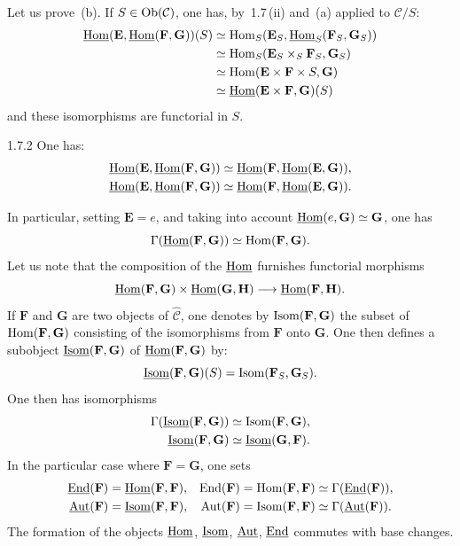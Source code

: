 Let us prove~(b). If \(S\in\operatorname{Ob}(\mathcal{C})\), one has, by~1.7\,(ii) and~(a) applied to \(\mathcal{C}/S\):
\[
\begin{aligned}
\underline{\operatorname{Hom}}(\mathbf{E},\underline{\operatorname{Hom}}(\mathbf{F},\mathbf{G}))(S)
&\simeq\operatorname{Hom}_S(\mathbf{E}_S,\underline{\operatorname{Hom}}_S(\mathbf{F}_S,\mathbf{G}_S))\\
&\simeq\operatorname{Hom}_S(\mathbf{E}_S\times_S\mathbf{F}_S,\mathbf{G}_S)\\
&\simeq\operatorname{Hom}(\mathbf{E}\times\mathbf{F}\times S,\mathbf{G})\\
&\simeq\underline{\operatorname{Hom}}(\mathbf{E}\times\mathbf{F},\mathbf{G})(S)
\end{aligned}
\]
and these isomorphisms are functorial in \(S\).

\begin{corollary}{1.7.2}
\label{I.1.7.2}
One has:
\begin{align*}
\underline{\operatorname{Hom}}(\mathbf{E},\underline{\operatorname{Hom}}(\mathbf{F},\mathbf{G}))
&\simeq\underline{\operatorname{Hom}}(\mathbf{F},\underline{\operatorname{Hom}}(\mathbf{E},\mathbf{G})),\\
\underline{\operatorname{Hom}}(\mathbf{E},\underline{\operatorname{Hom}}(\mathbf{F},\mathbf{G}))
&\simeq\underline{\operatorname{Hom}}(\mathbf{F},\underline{\operatorname{Hom}}(\mathbf{E},\mathbf{G})).
\end{align*}
\end{corollary}

In particular, setting \(\mathbf{E}=e\), and taking into account \(\underline{\operatorname{Hom}}(e,\mathbf{G})\simeq\mathbf{G}\), one has
\[
\Gamma(\underline{\operatorname{Hom}}(\mathbf{F},\mathbf{G}))\simeq\operatorname{Hom}(\mathbf{F},\mathbf{G}).
\]
Let us note that the composition of the \(\underline{\operatorname{Hom}}\) furnishes functorial morphisms
\[
\underline{\operatorname{Hom}}(\mathbf{F},\mathbf{G})\times\underline{\operatorname{Hom}}(\mathbf{G},\mathbf{H})\longrightarrow\underline{\operatorname{Hom}}(\mathbf{F},\mathbf{H}).
\]
If \(\mathbf{F}\) and \(\mathbf{G}\) are two objects of \(\widehat{\mathcal{C}}\), one denotes by \(\operatorname{Isom}(\mathbf{F},\mathbf{G})\) the subset of \(\operatorname{Hom}(\mathbf{F},\mathbf{G})\) consisting of the isomorphisms from \(\mathbf{F}\) onto \(\mathbf{G}\). One then defines a subobject \(\underline{\operatorname{Isom}}(\mathbf{F},\mathbf{G})\) of \(\underline{\operatorname{Hom}}(\mathbf{F},\mathbf{G})\) by:
\[
\underline{\operatorname{Isom}}(\mathbf{F},\mathbf{G})(S)=\operatorname{Isom}(\mathbf{F}_S,\mathbf{G}_S).
\]
One then has isomorphisms
\[
\begin{aligned}
\Gamma(\underline{\operatorname{Isom}}(\mathbf{F},\mathbf{G}))&\simeq\operatorname{Isom}(\mathbf{F},\mathbf{G}),\\
\underline{\operatorname{Isom}}(\mathbf{F},\mathbf{G})&\simeq\underline{\operatorname{Isom}}(\mathbf{G},\mathbf{F}).
\end{aligned}
\]
In the particular case where \(\mathbf{F}=\mathbf{G}\), one sets
\[
\begin{aligned}
\underline{\operatorname{End}}(\mathbf{F})&=\underline{\operatorname{Hom}}(\mathbf{F},\mathbf{F}),&
\operatorname{End}(\mathbf{F})&=\operatorname{Hom}(\mathbf{F},\mathbf{F})\simeq\Gamma(\underline{\operatorname{End}}(\mathbf{F})),\\
\underline{\operatorname{Aut}}(\mathbf{F})&=\underline{\operatorname{Isom}}(\mathbf{F},\mathbf{F}),&
\operatorname{Aut}(\mathbf{F})&=\operatorname{Isom}(\mathbf{F},\mathbf{F})\simeq\Gamma(\underline{\operatorname{Aut}}(\mathbf{F})).
\end{aligned}
\]
The formation of the objects \(\underline{\operatorname{Hom}}\), \(\underline{\operatorname{Isom}}\), \(\underline{\operatorname{Aut}}\), \(\underline{\operatorname{End}}\) commutes with base changes.

